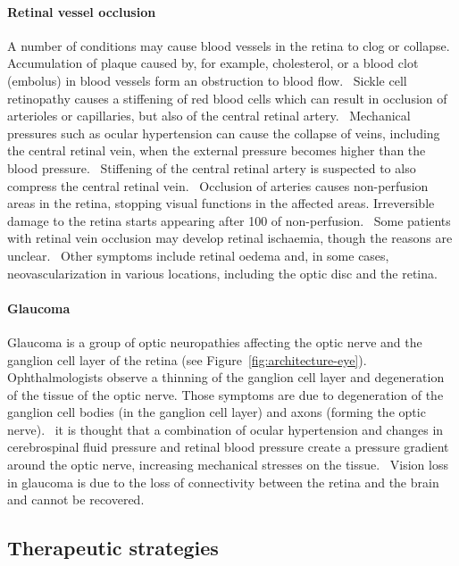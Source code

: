\documentclass{article}
\begin{document}
\paragraph*{Retinal vessel occlusion}
A number of conditions may cause blood vessels in the retina to clog or collapse.
Accumulation of plaque caused by, for example, cholesterol, or a blood clot (embolus) in blood vessels form an obstruction to blood flow.~\cite{Medina_2016}
Sickle cell retinopathy causes a stiffening of red blood cells which can result in occlusion of arterioles or capillaries, but also of the central retinal artery.~\cite{Medina_2016}
Mechanical pressures such as ocular hypertension can cause the collapse of veins, including the central retinal vein, when the external pressure becomes higher than the blood pressure.~\cite{Hayreh_2004}
Stiffening of the central retinal artery is suspected to also compress the central retinal vein.~\cite{Medina_2016}
Occlusion of arteries causes non-perfusion areas in the retina, stopping visual functions in the affected areas.
Irreversible damage to the retina starts appearing after \SI{100}{\min} of non-perfusion.~\cite{Hayreh_2004}
Some patients with retinal vein occlusion may develop retinal ischaemia, though the reasons are unclear.~\cite{Khayat_2018}
Other symptoms include retinal oedema and, in some cases, neovascularization in various locations, including the optic disc and the retina.~\cite{Medina_2016}
\\

\paragraph*{Glaucoma}
Glaucoma is a group of optic neuropathies affecting the optic nerve and the ganglion cell layer of the retina (see Figure~\ref{fig:architecture-eye}).
Ophthalmologists observe a thinning of the ganglion cell layer and degeneration of the tissue of the optic nerve.
Those symptoms are due to degeneration of the ganglion cell bodies (in the ganglion cell layer) and axons (forming the optic nerve).~\cite{Quigley_2011}
it is thought that a combination of ocular hypertension and changes in cerebrospinal fluid pressure and retinal blood pressure create a pressure gradient around the optic nerve, increasing mechanical stresses on the tissue.~\cite{Band_2009,Nickells_2012}
Vision loss in glaucoma is due to the loss of connectivity between the retina and the brain and cannot be recovered.~\cite{Quigley_2011} 


\subsection*{Therapeutic strategies}
\end{document}
